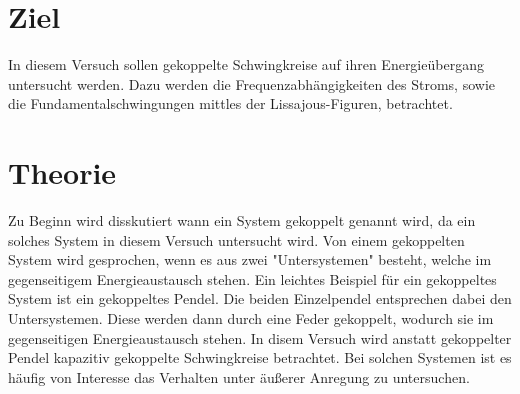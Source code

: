 \section{Ziel}
\label{sec:Ziel}
In diesem Versuch sollen gekoppelte Schwingkreise auf ihren Energieübergang untersucht werden. Dazu werden die Frequenzabhängigkeiten des Stroms, sowie die Fundamentalschwingungen mittles der Lissajous-Figuren,
betrachtet.
\section{Theorie}
\label{sec:Theorie}
Zu Beginn wird disskutiert wann ein System gekoppelt genannt wird, da ein solches System in diesem Versuch untersucht wird. Von einem gekoppelten System wird gesprochen, wenn es aus zwei "Untersystemen"
besteht, welche im gegenseitigem Energieaustausch stehen. Ein leichtes Beispiel für ein gekoppeltes System ist ein gekoppeltes Pendel. Die beiden Einzelpendel entsprechen dabei den Untersystemen.
Diese werden dann durch eine Feder gekoppelt, wodurch sie im gegenseitigen Energieaustausch stehen. In disem Versuch wird anstatt gekoppelter Pendel kapazitiv gekoppelte Schwingkreise betrachtet.
Bei solchen Systemen ist es häufig von Interesse das Verhalten unter äußerer Anregung zu untersuchen.

